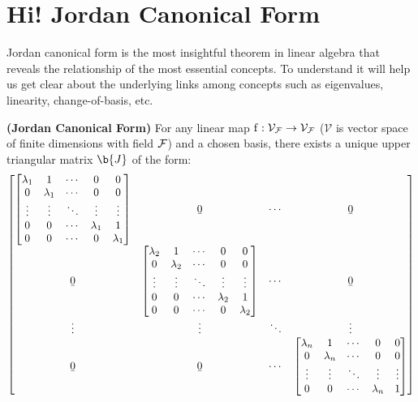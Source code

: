 \section{Hi! Jordan Canonical Form}

Jordan canonical form is the most insightful theorem in linear algebra that reveals the relationship of the most essential concepts. 
To understand it will help us get clear about the underlying links among concepts such as eigenvalues, linearity, change-of-basis, etc.



\begin{theorem} \label{JCF}
\textbf{(Jordan Canonical Form)} For any linear map $\f : \VF \to \VF$ ($\mathcal{V}$ is vector space of finite dimensions with field $\F$) and a chosen basis, there exists a unique upper triangular matrix $\b{J}$  of the form:\\
$$\begin{bmatrix}
    \begin{bmatrix}
        \lambda_1 & 1 & \cdots & 0 &0 \\
        0 &\lambda_1 & \cdots &0 &0\\
        \vdots &\vdots  &\ddots &\vdots &\vdots \\
        0 &0 &\cdots &\lambda_1 &1 \\
        0 &0 &\cdots &0 &\lambda_1
    \end{bmatrix}
    &\b{0} & \cdots &\b{0} \\
    \b{0}   &\begin{bmatrix}
        \lambda_2 & 1 & \cdots &0 &0 \\
        0 &\lambda_2 & \cdots &0 &0\\
        \vdots &\vdots  &\ddots &\vdots &\vdots \\
        0 &0 &\cdots &\lambda_2 &1 \\
        0 &0 &\cdots &0 &\lambda_2
        \end{bmatrix}
    & \cdots &\b{0}  \\
    \vdots &\vdots &\ddots &\vdots \\
    \b{0}  &\b{0}  &\cdots &\begin{bmatrix}
                    \lambda_n & 1 & \cdots &0 &0 \\
                     0 &\lambda_n & \cdots &0 &0\\
                     \vdots &\vdots  &\ddots &\vdots &\vdots \\
                    0 &0 &\cdots &\lambda_n &1 \\

\end{bmatrix}
\end{bmatrix}$$
\end{theorem}
